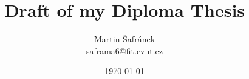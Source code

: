 \documentclass{article}
\begin{document}
    \title{Draft of my Diploma Thesis}
    \author{Martin Šafránek \\  \href{mailto:saframa6@fit.cvut.cz}{saframa6@fit.cvut.cz}}
    \date{\today}
    \maketitle
    \tableofcontents
    \newpage

    

    \printbibliography
    \appendix
\end{document}

